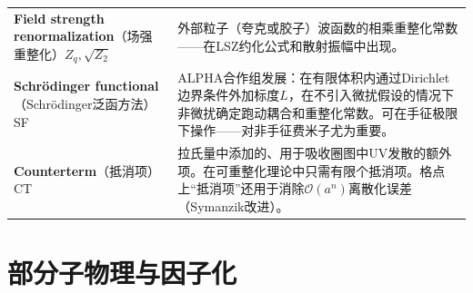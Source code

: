 \documentclass[12pt,a4paper]{ctexart}
\begin{document}
\begin{longtable}{p{3.5cm}p{9cm}}
\textbf{Field strength renormalization}（场强重整化）$Z_q,\sqrt{Z_2}$& 外部粒子（夸克或胶子）波函数的相乘重整化常数——在LSZ约化公式和散射振幅中出现。\\
\textbf{Schr\"odinger functional}（Schr\"odinger泛函方法）SF& ALPHA合作组发展：在有限体积内通过Dirichlet边界条件外加标度$L$，在不引入微扰假设的情况下非微扰确定跑动耦合和重整化常数。可在手征极限下操作——对非手征费米子尤为重要。\\
\textbf{Counterterm}（抵消项）CT& 拉氏量中添加的、用于吸收圈图中UV发散的额外项。在可重整化理论中只需有限个抵消项。格点上``抵消项''还用于消除$\mathcal{O}(a^n)$离散化误差（Symanzik改进）。\\
\bottomrule
\end{longtable}

\section{部分子物理与因子化}
\end{document}
